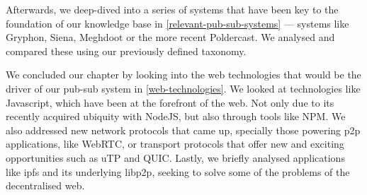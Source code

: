 Afterwards, we deep-dived into a series of systems that have been key to the
foundation of our knowledge base in \ref{relevant-pub-sub-systems} — systems
like Gryphon, Siena, Meghdoot or the more recent Poldercast. We analysed and
compared these using our previously defined taxonomy.

We concluded our chapter by looking into the web technologies that would be the
driver of our pub-sub system in \ref{web-technologies}. We looked at
technologies like Javascript, which have been at the forefront of the web. Not
only due to its recently acquired ubiquity with NodeJS, but also through tools
like NPM. We also addressed new network protocols that came up, specially those
powering \acrshort{p2p} applications, like WebRTC, or transport protocols that
offer new and exciting opportunities such as uTP and QUIC. Lastly, we briefly
analysed applications like \acrshort{ipfs} and its underlying libp2p, seeking
to solve some of the problems of the decentralised web.
